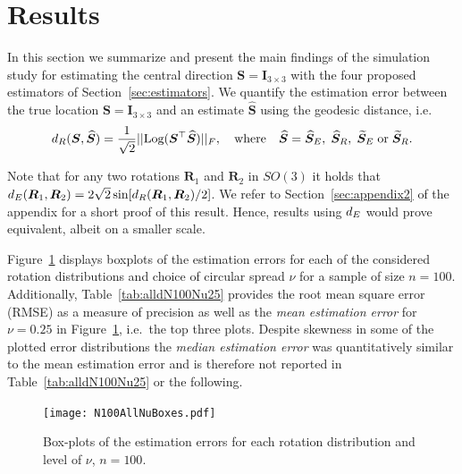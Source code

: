 \section{Results}\label{sec:results}

In this section we summarize and present the main findings of the simulation study for  estimating the central direction $\bm S = \bm I_{3\times 3}$ with the four proposed estimators of Section~\ref{sec:estimators}. We quantify the estimation error between the true location $\bm S = \bm I_{3\times 3}$ and an estimate $\widehat{\bm S}$ using the geodesic distance, i.e.  
\begin{equation}
{d_R}(\bm{S}, \widehat{\bm{S}}) =  \frac{1}{\sqrt{2}}||
\text{Log}(\bm{S}^\top\widehat{\bm{S}})||_F, \quad \mbox{where} \quad \widehat{\bm{S}} =  {\widehat{\bm S}_E}, \; {\widehat{\bm S}_R},\;  {\widetilde{\bm S}_E} \; \mbox{or} \; {\widetilde{\bm S}_R}.
\end{equation}

\noindent Note that for any two rotations $\bm R_1$ and $\bm R_2$ in $SO(3)$ it holds that ${d_E}(\bm R_1,\bm R_2)=2\sqrt{2}\sin[{d_R}(\bm R_1,\bm R_2)/2]$. We refer to Section~\ref{sec:appendix2} of the appendix for a short proof of this result.  Hence, results using ${d_E}$ would prove equivalent, albeit on a smaller scale.   

Figure~\ref{fig:NuBoxes} displays boxplots of the estimation errors for each of the considered rotation distributions and choice of circular spread $\nu$ for a sample of size  $n=100$.  Additionally,  Table~\ref{tab:alldN100Nu25} provides the root mean square error (RMSE) as a measure of precision as well as the \textit{mean estimation error} for $\nu=0.25$ in Figure~\ref{fig:NuBoxes}, i.e.~the top three plots. Despite skewness in some of the plotted error distributions the \textit{median estimation error} was quantitatively similar to the mean estimation error and is therefore not reported in Table~\ref{tab:alldN100Nu25} or the following.
\begin{figure}[h!]
\centering
\texttt{[image: N100AllNuBoxes.pdf]}
\caption{Box-plots of the estimation errors for each rotation distribution and level of $\nu$,  $n=100$.}
\label{fig:NuBoxes}
\end{figure}

